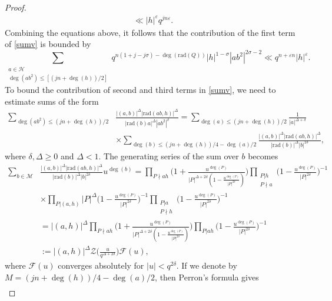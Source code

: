 \documentclass[12pt]{amsart}
\begin{document}
\begin{proof}
\begin{align*}
  \ll |h|^{\varepsilon} q^{jn \varepsilon}.
 \end{align*}
 Combining the equations above, it follows that the contribution of the first term of  \eqref{sumv} is bounded by
 \begin{equation} \sum_{\substack{a \in \mathcal{H} \\ \deg(ab^2) \leq [(jn+\deg(h))/2]}}q^{n(1+j-j\sigma)-\deg(\text{rad}(Q))} |h|^{1-\sigma} |ab^2|^{2\sigma-2} \ll q^{n+\varepsilon n} |h|^{\varepsilon}  .
   \label{first_term}
 \end{equation}
To bound the contribution of second and third terms in \eqref{sumv}, we need to estimate sums of the form
\begin{align}
\sum_{\deg(ab^2)\leq (jn+\deg(h))/2} & \frac{|(a,b)|^{\Delta}|\text{rad}(ab,h)|^{\Delta}}{| \text{rad}(b) a|^{\Delta}|ab^2|^\delta}= \sum_{\deg(a) \leq (jn+\deg(h))/2} \frac{1}{|a|^{\Delta+\delta}} \nonumber \\
& \times \sum_{\deg(b) \leq (jn+\deg(h))/4-\deg(a)/2} \frac{|(a,b)|^{\Delta}|\text{rad}(ab,h)|^{\Delta}}{|\text{rad}(b)|^{\Delta} |b|^{2\delta}},
\label{toestimate}
\end{align}
where $\delta, \Delta\geq 0$ and $\Delta<1$. The generating series of the sum over $b$ becomes
\begin{align*}
\sum_{b \in \mathcal{M}} & \frac{|(a,b)|^{\Delta}|\text{rad}(ab,h)|^{\Delta}}{|\text{rad}(b)|^{\Delta} |b|^{2\delta}} u^{\deg(b)} = \prod_{P \nmid ah} \Big(  1+ \frac{u^{\deg(P)}}{|P|^{\Delta+2\delta} (1- \frac{u^{\deg(P)}}{|P|^{2\delta}})}\Big) \prod_{\substack{P | h \\ P \nmid a}} \Big(1 - \frac{u^{\deg(P)}}{|P|^{2\delta}} \Big)^{-1} \\
& \times \prod_{P|(a,h)} |P|^{\Delta} \Big(1 - \frac{u^{\deg(P)}}{|P|^{2\delta}} \Big)^{-1} \prod_{\substack{P |a \\ P\nmid h}} \Big(1 - \frac{u^{\deg(P)}}{|P|^{2\delta}} \Big)^{-1} \\
&= |(a,h)|^{\Delta} \prod_{P \nmid ah} \Big(  1+ \frac{u^{\deg(P)}}{|P|^{\Delta+2\delta} (1- \frac{u^{\deg(P)}}{|P|^{2\delta}})}\Big) \prod_{P|ah} \Big(1 - \frac{u^{\deg(P)}}{|P|^{2\delta}} \Big)^{-1}  \\
& := |(a,h)|^{\Delta} \mathcal{Z}\Big(  \frac{u}{q^{\Delta+2\delta}}\Big) \mathcal{F}(u), 
\end{align*}
where $\mathcal{F}(u)$ converges absolutely for $|u|<q^{2\delta}$.
If we denote by $M = (jn+\deg(h))/4-\deg(a)/2$, then Perron's formula gives
\begin{align*}

\end{align*}
\end{proof}
\end{document}

